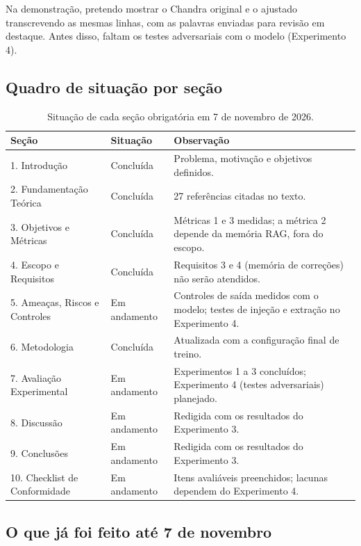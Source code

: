 \documentclass[12pt,a4paper]{article}
\begin{document}
Na demonstração, pretendo mostrar o Chandra original e o ajustado transcrevendo as mesmas linhas, com as palavras enviadas para revisão em destaque. Antes disso, faltam os testes adversariais com o modelo (Experimento 4).

\subsection*{Quadro de situação por seção}

\begin{table}[H]
\centering
\small
\begin{tabular}{@{}p{5.2cm}lp{7.3cm}@{}}
\toprule
Seção & Situação & Observação \\
\midrule
1. Introdução & Concluída & Problema, motivação e objetivos definidos. \\
2. Fundamentação Teórica & Concluída & 27 referências citadas no texto. \\
3. Objetivos e Métricas & Concluída & Métricas 1 e 3 medidas; a métrica 2 depende da memória RAG, fora do escopo. \\
4. Escopo e Requisitos & Concluída & Requisitos 3 e 4 (memória de correções) não serão atendidos. \\
5. Ameaças, Riscos e Controles & Em andamento & Controles de saída medidos com o modelo; testes de injeção e extração no Experimento 4. \\
6. Metodologia & Concluída & Atualizada com a configuração final de treino. \\
7. Avaliação Experimental & Em andamento & Experimentos 1 a 3 concluídos; Experimento 4 (testes adversariais) planejado. \\
8. Discussão & Em andamento & Redigida com os resultados do Experimento 3. \\
9. Conclusões & Em andamento & Redigida com os resultados do Experimento 3. \\
10. Checklist de Conformidade & Em andamento & Itens avaliáveis preenchidos; lacunas dependem do Experimento 4. \\
\bottomrule
\end{tabular}
\caption{Situação de cada seção obrigatória em 7 de novembro de 2026.}
\label{tab:situacao}
\end{table}

\subsection*{O que já foi feito até 7 de novembro}
\end{document}
